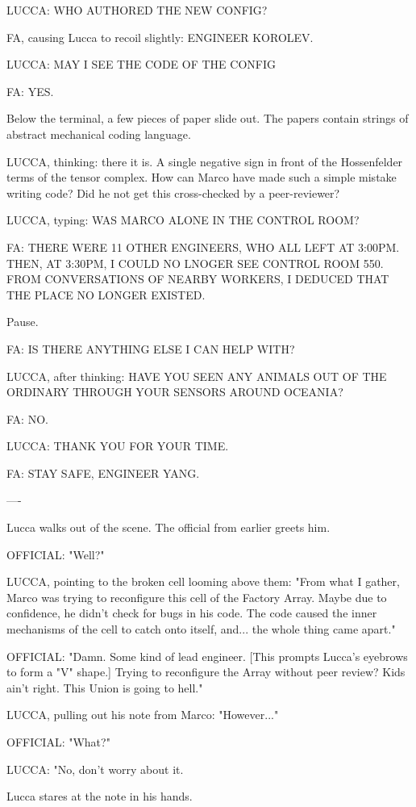 \documentclass[11pt]{article}
\begin{document}
LUCCA: WHO AUTHORED THE NEW CONFIG?

FA, causing Lucca to recoil slightly: ENGINEER KOROLEV. 

LUCCA: MAY I SEE THE CODE OF THE CONFIG

FA: YES. 

Below the terminal, a few pieces of paper slide out. 
The papers contain strings of abstract mechanical coding language. 

LUCCA, thinking: there it is. 
A single negative sign in front of the Hossenfelder terms of the tensor complex. 
How can Marco have made such a simple mistake writing code? 
Did he not get this cross-checked by a peer-reviewer?

LUCCA, typing: WAS MARCO ALONE IN THE CONTROL ROOM?

FA: THERE WERE 11 OTHER ENGINEERS, WHO ALL LEFT AT 3:00PM. 
THEN, AT 3:30PM, I COULD NO LNOGER SEE CONTROL ROOM 550. 
FROM CONVERSATIONS OF NEARBY WORKERS, I DEDUCED THAT THE PLACE NO LONGER EXISTED. 

Pause.

FA: IS THERE ANYTHING ELSE I CAN HELP WITH?

LUCCA, after thinking: HAVE YOU SEEN ANY ANIMALS OUT OF THE ORDINARY THROUGH YOUR SENSORS AROUND OCEANIA?

FA: NO.

LUCCA: THANK YOU FOR YOUR TIME.

FA: STAY SAFE, ENGINEER YANG.

----

Lucca walks out of the scene. The official from earlier greets him. 

OFFICIAL: "Well?"

LUCCA, pointing to the broken cell looming above them: "From what I gather, Marco was trying to reconfigure this cell of the Factory Array. 
Maybe due to confidence, he didn't check for bugs in his code. The code caused the inner mechanisms of the cell to catch onto itself, and...
the whole thing came apart."

OFFICIAL: "Damn. Some kind of lead engineer. [This prompts Lucca's eyebrows to form a "V" shape.] 
Trying to reconfigure the Array without peer review? Kids ain't right. This Union is going to hell."

LUCCA, pulling out his note from Marco: "However..."

OFFICIAL: "What?"

LUCCA: "No, don't worry about it. 

Lucca stares at the note in his hands. 
\end{document}
